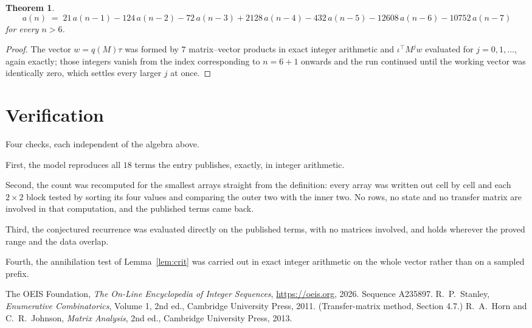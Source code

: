 \documentclass[11pt,a4paper]{article}
\theoremstyle{plain}
\newtheorem{theorem}{Theorem}
\theoremstyle{definition}
\begin{document}
\begin{theorem}
\[
a(n)\;=\;21\,a(n-1) - 124\,a(n-2) - 72\,a(n-3) + 2128\,a(n-4) - 432\,a(n-5) - 12608\,a(n-6) - 10752\,a(n-7)
\]
for every $n>6$.
\end{theorem}

\begin{proof}
The vector $w=q(M)\tau$ was formed by $7$ matrix--vector products in exact integer
arithmetic and $\iota^{\!\top}M^{j}w$ evaluated for $j=0,1,\dots$, again exactly; those
integers vanish from the index corresponding to $n=6+1$ onwards and the run continued
until the working vector was identically zero, which settles every larger $j$ at once.
\end{proof}

\section{Verification}

Four checks, each independent of the algebra above.

First, the model reproduces all $18$ terms the entry publishes, exactly, in integer
arithmetic.

Second, the count was recomputed for the smallest arrays straight from the definition: every
array was written out cell by cell and each $2\times2$ block tested by sorting its four values
and comparing the outer two with the inner two. No rows, no state and no transfer matrix are
involved in that computation, and the published terms came back.

Third, the conjectured recurrence was evaluated directly on the published terms, with no
matrices involved, and holds wherever the proved range and the data overlap.

Fourth, the annihilation test of Lemma~\ref{lem:crit} was carried out in exact integer
arithmetic on the whole vector rather than on a sampled prefix.

\begin{thebibliography}{9}
 The OEIS Foundation, \emph{The On-Line Encyclopedia of Integer
Sequences}, \url{https://oeis.org}, 2026. Sequence A235897.
 R.~P.~Stanley, \emph{Enumerative Combinatorics}, Volume 1, 2nd ed.,
Cambridge University Press, 2011. (Transfer-matrix method, Section 4.7.)
 R.~A.~Horn and C.~R.~Johnson, \emph{Matrix Analysis}, 2nd ed., Cambridge
University Press, 2013.
\end{thebibliography}
\end{document}
